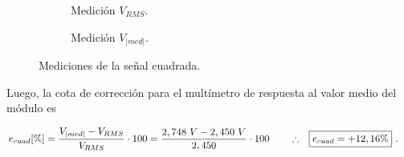       \begin{figure}[H]
        \centering
        \begin{subfigure}[ht]{0.48\textwidth}
          \caption{Medición $V_{RMS}$.}
          \label{fig:MedicionVrmsCuadrada}
        \end{subfigure}
        \hfill 
        \begin{subfigure}[ht]{0.48\textwidth}
          \caption{Medición $V_{|med|}$.}
          \label{fig:MedicionVmedCuadrada}
        \end{subfigure}
        \caption{Mediciones de la señal cuadrada.}
         \label{fig:MedicionSeñalCuadrada}
      \end{figure}


      Luego, la cota de corrección para el multímetro de respuesta al valor medio del módulo es

      \begin{align*}
        e_{cuad} [\%] = \dfrac{V_{|med|} - V_{RMS}}{V_{RMS}} \cdot 100
               = \dfrac{2,748~V - 2,450~V}{2,450} \cdot 100
               \hspace{20pt} \therefore \hspace{10pt} \Aboxed{e_{cuad} = +12,16\%}~.
      \end{align*}


